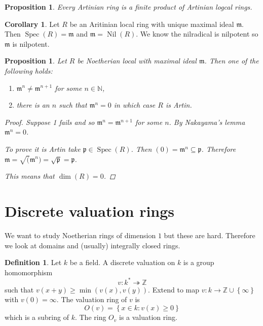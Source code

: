 \documentclass{article}
\newcommand{\N}{\mathbb{N}}
\newcommand{\Z}{\mathbb{Z}}
\newcommand{\set}[1]{\left\{#1\right\}}
\newcommand{\setwith}[2]{\left\{#1:#2\right\}}
\DeclareMathOperator{\Nil}{Nil}
\DeclareMathOperator{\Spec}{Spec}
\newcommand{\maxid}{\mathfrak{m}}
\newcommand{\primeid}{\mathfrak{p}}
\newtheorem{proposition}[theorem]{Proposition}
\theoremstyle{definition}
\newtheorem{definition}[theorem]{Definition}
\newtheorem{corollary}[theorem]{Corollary}
\begin{document}
\begin{proposition}
    Every Artinian ring is a finite product of Artinian logcal rings.
\end{proposition}

\begin{corollary}
    Let \(R\) be an Aritinian local ring with unique maximal ideal \(\maxid\).
    Then \(\Spec(R)=\maxid\) and \(\maxid=\Nil(R)\). We know the nilradical is
    nilpotent so \(\maxid\) is nilpotent.
\end{corollary}

\begin{proposition}
    Let \(R\) be Noetherian local with maximal ideal \(\maxid\). Then one of the
    following holds:
    \begin{enumerate}
        \item \(\maxid^{n}\neq\maxid^{n+1}\) for some \(n\in\N\),
        \item there is an \(n\) such that \(\maxid^{n}=0\) in which case \(R\)
              is Artin.
    \end{enumerate}

    \begin{proof}
        Suppose 1 fails and so \(\maxid^{n}=\maxid^{n+1}\) for some \(n\).
        By Nakayama's lemma \(\maxid^{n}=0\).

        To prove it is Artin take \(\primeid\in\Spec(R)\). Then
        \((0)=\maxid^{n}\subseteq\primeid\). Therefore
        \(\maxid=\sqrt(\maxid^{n})=\sqrt{\primeid}=\primeid\).

        This means that \(\dim(R)=0\).
    \end{proof}
\end{proposition}

\section{Discrete valuation rings}
We want to study Noetherian rings of dimension \(1\) but these are hard.
Therefore we look at domains and (usually) integrally closed rings.

\begin{definition}
    Let \(k\) be a field. A discrete valuation on \(k\) is a group homomorphism
    \[
        v:k^{*}\twoheadrightarrow\Z
    \]
    such that \(v(x+y)\geq\min(v(x),v(y))\). Extend to map \(v:k\to
    \Z\cup\set{\infty}\) with \(v(0)=\infty\). The valuation ring of \(v\) is
    \[
        O(v)=\setwith{x\in k}{v(x)\geq 0}
    \]
    which is a subring of \(k\). The ring \(O_{v}\) is a valuation ring.
\end{definition}
\end{document}
